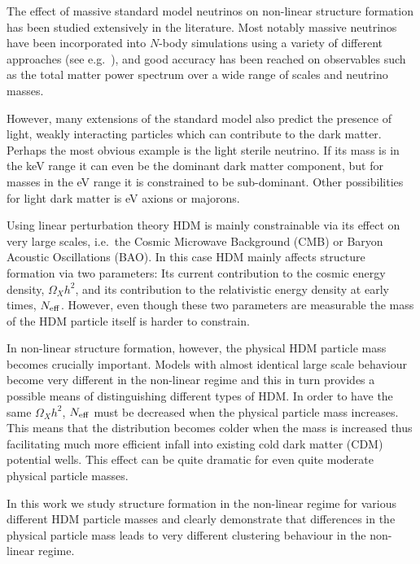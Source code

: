 \documentclass[11pt,a4paper]{article}
\renewcommand\({\left(}
\renewcommand\){\right)}
\renewcommand\[{\left[}
\renewcommand\]{\right]}
\begin{document}
The effect of massive standard model neutrinos on non-linear structure formation has been studied extensively in the literature. Most notably massive neutrinos have been incorporated into $N$-body simulations using a variety of different approaches
(see e.g.\ \cite{Brandbyge:2008rv,Brandbyge:2009ce,Brandbyge:2010ge,Brandbyge:2008js,Massara:2014kba,Agarwal:2010mt,Viel:2010bn,Wagner:2012sw,AliHaimoud:2012vj,Baldi:2013iza,Inman:2015pfa,Lawrence:2017ost,Bird:2011rb}), and good accuracy has been reached on observables such as the total matter power spectrum over a wide range of scales and neutrino masses.

However, many extensions of the standard model also predict the presence of light, weakly interacting particles which can contribute to the dark matter. Perhaps the most obvious example is the light sterile neutrino. If its mass is in the keV range it can even be the dominant dark matter component, but for masses in the eV range it is constrained to be sub-dominant. Other possibilities for light dark matter is eV axions or majorons.

Using linear perturbation theory HDM is mainly constrainable via its effect on very large scales, i.e.\ the Cosmic Microwave Background (CMB) or Baryon Acoustic Oscillations (BAO). In this case HDM mainly affects structure formation via two parameters: Its current contribution to the cosmic energy density, $\Omega_X h^2$, and its contribution to the relativistic energy density at early times, $N_{\rm eff}$. However, even though these two parameters are measurable the mass of the HDM particle itself is harder to constrain.

In non-linear structure formation, however, the physical HDM particle mass becomes crucially important. Models with almost identical large scale behaviour become very different in the non-linear regime and this in turn provides a possible means of distinguishing different types of HDM. In order to have the same $\Omega_X h^2$, $N_{\rm eff}$ must be decreased when the physical particle mass increases. This means that the distribution becomes colder when the mass is increased thus facilitating much more efficient infall into existing cold dark matter (CDM) potential wells. This effect can be quite dramatic for even quite moderate physical particle masses.

In this work we study structure formation in the non-linear regime for various different HDM particle masses and clearly demonstrate that differences in the physical particle mass leads to very different clustering behaviour in the non-linear regime.
\end{document}
